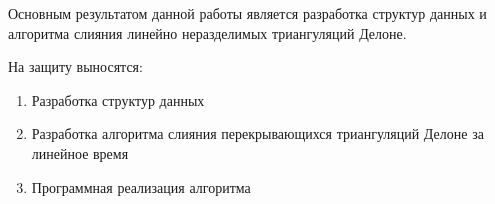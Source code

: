 \documentclass[12pt]{article}
\begin{document}
Основным результатом данной работы является разработка структур данных и
алгоритма слияния линейно неразделимых триангуляций Делоне.

На защиту выносятся:

\begin{enumerate}
	\item Разработка структур данных
	\item Разработка алгоритма слияния перекрывающихся триангуляций Делоне за линейное время
	\item Программная реализация алгоритма
\end{enumerate}

\newpage




\end{document}
